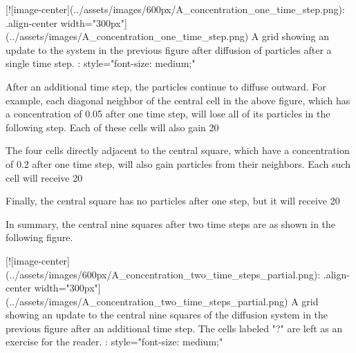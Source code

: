{{{{{{{{[![image-center](../assets/images/600px/A_concentration_one_time_step.png){: .align-center width="300px"}](../assets/images/A_concentration_one_time_step.png)
A grid showing an update to the system in the previous figure after diffusion of particles after a single time step.
{: style="font-size: medium;"}

\begin{note}\end{note}

After an additional time step, the particles continue to diffuse outward. For example, each diagonal neighbor of the central cell in the above figure, which has a concentration of 0.05 after one time step, will lose all of its particles in the following step. Each of these cells will also gain 20%

The four cells directly adjacent to the central square, which have a concentration of 0.2 after one time step, will also gain particles from their neighbors. Each such cell will receive 20%

Finally, the central square has no particles after one step, but it will receive 20%

In summary, the central nine squares after two time steps are as shown in the following figure.

[![image-center](../assets/images/600px/A_concentration_two_time_steps_partial.png){: .align-center width="300px"}](../assets/images/A_concentration_two_time_steps_partial.png)
A grid showing an update to the central nine squares of the diffusion system in the previous figure after an additional time step. The cells labeled "?" are left as an exercise for the reader.
{: style="font-size: medium;"}

}}}}}}}}
